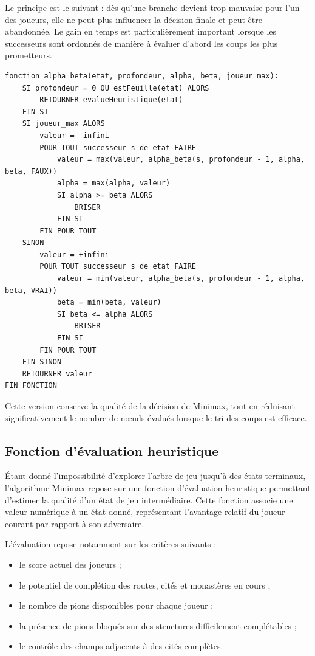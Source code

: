 \documentclass[11pt]{article}
\begin{document}
Le principe est le suivant : dès qu’une branche devient trop mauvaise pour l’un des joueurs, elle ne peut plus influencer la décision finale et peut être abandonnée. Le gain en temps est particulièrement important lorsque les successeurs sont ordonnés de manière à évaluer d’abord les coups les plus prometteurs.

{\normalsize
  \begin{verbatim}
fonction alpha_beta(etat, profondeur, alpha, beta, joueur_max):
    SI profondeur = 0 OU estFeuille(etat) ALORS
        RETOURNER evalueHeuristique(etat)
    FIN SI
    SI joueur_max ALORS
        valeur = -infini
        POUR TOUT successeur s de etat FAIRE
            valeur = max(valeur, alpha_beta(s, profondeur - 1, alpha, beta, FAUX))
            alpha = max(alpha, valeur)
            SI alpha >= beta ALORS
                BRISER
            FIN SI
        FIN POUR TOUT
    SINON
        valeur = +infini
        POUR TOUT successeur s de etat FAIRE
            valeur = min(valeur, alpha_beta(s, profondeur - 1, alpha, beta, VRAI))
            beta = min(beta, valeur)
            SI beta <= alpha ALORS
                BRISER
            FIN SI
        FIN POUR TOUT
    FIN SINON
    RETOURNER valeur
FIN FONCTION
  \end{verbatim}
}

Cette version conserve la qualité de la décision de Minimax, tout en réduisant significativement le nombre de nœuds évalués lorsque le tri des coups est efficace.

\subsection{Fonction d’évaluation heuristique}

Étant donné l’impossibilité d’explorer l’arbre de jeu jusqu’à des états terminaux, l’algorithme Minimax repose sur une fonction d’évaluation heuristique permettant d’estimer la qualité d’un état de jeu intermédiaire.
Cette fonction associe une valeur numérique à un état donné, représentant l’avantage relatif du joueur courant par rapport à son adversaire.

L’évaluation repose notamment sur les critères suivants :
\begin{itemize}
  \item [$\bullet$] le score actuel des joueurs ;
  \item [$\bullet$] le potentiel de complétion des routes, cités et monastères en cours ;
  \item [$\bullet$] le nombre de pions disponibles pour chaque joueur ;
  \item [$\bullet$] la présence de pions bloqués sur des structures difficilement complétables ;
  \item [$\bullet$] le contrôle des champs adjacents à des cités complètes.
\end{itemize}
\end{document}
